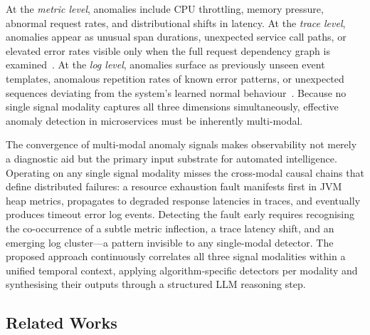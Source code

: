 \documentclass[a4paper,anonymous,UKenglish]{lipics-v2021}
\begin{document}
At the \textit{metric level}, anomalies include CPU throttling, memory
pressure, abnormal request rates, and distributional shifts in latency. At the
\textit{trace level}, anomalies appear as unusual span durations, unexpected
service call paths, or elevated error rates visible only when the full request
dependency graph is examined~\cite{liu2020unsupervised}. At the \textit{log
level}, anomalies surface as previously unseen event templates, anomalous
repetition rates of known error patterns, or unexpected sequences deviating
from the system's learned normal behaviour~\cite{he2021bert}. Because no single
signal modality captures all three dimensions simultaneously, effective anomaly
detection in microservices must be inherently multi-modal.

The convergence of multi-modal anomaly signals makes observability not merely
a diagnostic aid but the primary input substrate for automated intelligence.
Operating on any single signal modality misses the cross-modal causal chains
that define distributed failures: a resource exhaustion fault manifests first
in JVM heap metrics, propagates to degraded response latencies in traces, and
eventually produces timeout error log events. Detecting the fault early
requires recognising the co-occurrence of a subtle metric inflection, a trace
latency shift, and an emerging log cluster---a pattern invisible to any
single-modal detector. The proposed approach continuously correlates all three
signal modalities within a unified temporal context, applying
algorithm-specific detectors per modality and synthesising their outputs
through a structured LLM reasoning step.

\subsection{Related Works}
\end{document}
